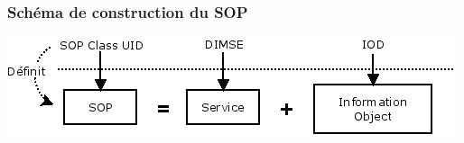 	\frame
	{
		\frametitle{Sch\'ema de construction du SOP}
		\begin{center}
			\includegraphics[width=\linewidth]{./figures/sop-definition.png}
		\end{center}		
	}


